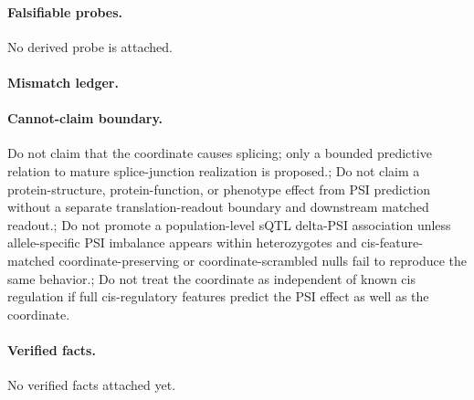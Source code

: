 \paragraph{Falsifiable probes.}
No derived probe is attached.

\paragraph{Mismatch ledger.}
\paragraph{Cannot-claim boundary.} Do not claim that the coordinate causes splicing; only a bounded predictive relation to mature splice-junction realization is proposed.; Do not claim a protein-structure, protein-function, or phenotype effect from PSI prediction without a separate translation-readout boundary and downstream matched readout.; Do not promote a population-level sQTL delta-PSI association unless allele-specific PSI imbalance appears within heterozygotes and cis-feature-matched coordinate-preserving or coordinate-scrambled nulls fail to reproduce the same behavior.; Do not treat the coordinate as independent of known cis regulation if full cis-regulatory features predict the PSI effect as well as the coordinate.

\paragraph{Verified facts.}
No verified facts attached yet.
